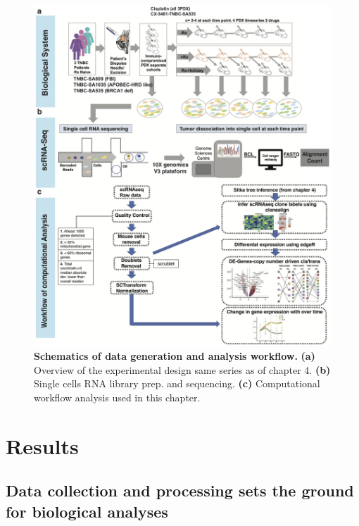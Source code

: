 \begin{figure}
\centering
\includegraphics[width=\textwidth]{Figures/chap5/RNAworkflow.png}
	
\caption[Schematics of experimental design and analysis workflow]
	{\small
	\textbf{Schematics of data generation and analysis workflow.}
	   \textbf{(a)} Overview of the experimental design same series as of chapter 4.
	    \textbf{(b)} Single cells RNA library prep. and sequencing.
	    \textbf{(c)} Computational workflow analysis used in this chapter.
	}
	\label{fig:chap5RNAworkflow}
\end{figure}


\section{Results}
 

\subsection{Data collection and processing sets the ground for biological analyses} 
  
